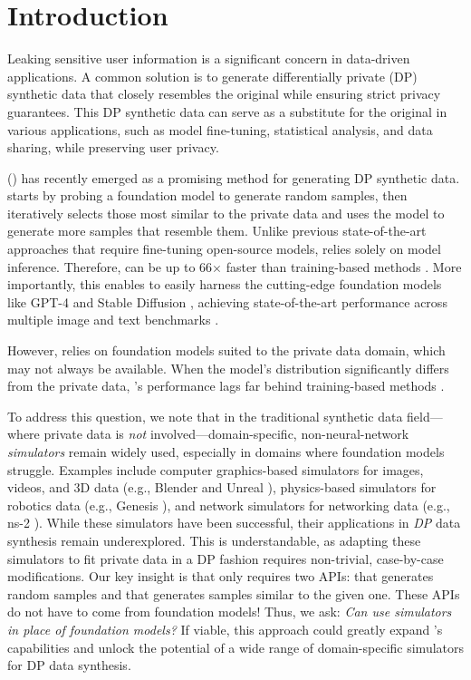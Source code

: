 \section{Introduction}
Leaking sensitive user information is a significant concern in data-driven applications. A common solution is to generate differentially private (DP) \cite{dwork2006calibrating} synthetic data that closely resembles the original while ensuring strict privacy guarantees. This DP synthetic data can serve as a substitute for the original in various applications, such as model fine-tuning, statistical analysis, and data sharing, while preserving user privacy.

\privateevolution{} (\pe{}) \cite{lin2023differentially,xie2024differentially} has recently emerged as a promising method for generating DP synthetic data. 
\pe{} starts by probing a foundation model to generate random samples, then iteratively selects those most similar to the private data and uses the model to generate more samples that resemble them.
Unlike previous state-of-the-art approaches that require fine-tuning open-source models, \pe{} relies solely on model inference.
Therefore, \pe{} can be up to 66$\times$ faster than training-based methods \cite{xie2024differentially}.
More importantly, this enables \pe{} to easily harness the cutting-edge foundation models like GPT-4 \cite{openai2023gpt4} and Stable Diffusion \cite{rombach2022high}, achieving state-of-the-art performance across multiple image and text benchmarks \cite{lin2023differentially,xie2024differentially,hou2024pre,zou2025contrastive}.

However, \pe{} relies on foundation models suited to the private data domain, which may not always be available. When the model's distribution significantly differs from the private data, \pe{}'s performance lags far behind training-based methods \cite{dpimagebench}.

To address this question, we note that in the traditional synthetic data field—where private data is \emph{not} involved—domain-specific, non-neural-network \emph{simulators} remain widely used, especially in domains where foundation models struggle. Examples include computer graphics-based simulators for images, videos, and 3D data (e.g., Blender \cite{blender} and Unreal \cite{unreal}), physics-based simulators for robotics data (e.g., Genesis \cite{Genesis}), and network simulators for networking data (e.g., ns-2 \cite{issariyakul2009introduction}). While these simulators have been successful, their applications in \emph{DP} data synthesis remain underexplored. This is understandable, as adapting these simulators to fit private data in a DP fashion requires non-trivial, case-by-case modifications.
Our key insight is that \pe{} only requires two APIs: \randomsampleapiname{} that generates random samples and \samplevariationapiname{} that generates samples similar to the given one. These APIs do not have to come from foundation models! Thus, we ask: 
\emph{Can \pe{} use simulators in place of foundation models?}
If viable, this approach could greatly expand \pe{}'s capabilities and unlock the potential of a wide range of domain-specific simulators for DP data synthesis.

